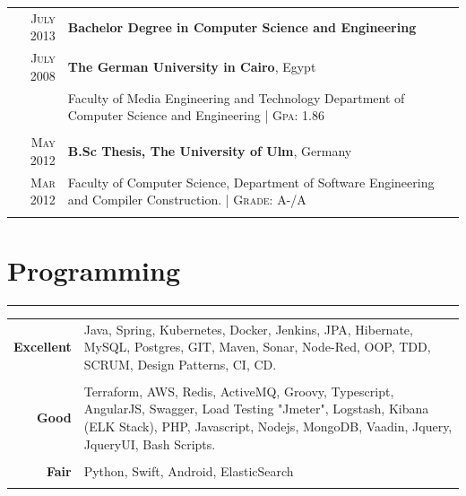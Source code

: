 \documentclass[a4paper,13pt]{article}
\begin{document}
\begin{adjustwidth}{-3cm}{}
\begin{tabular}{r|p{17.5cm}}
\textsc{July} 2013 & \textbf{Bachelor Degree in Computer Science and Engineering}\\ \textsc{July} 2008& \normalsize\textbf{The German University in Cairo}, Egypt\\
& \small{Faculty of Media Engineering and Technology} \small{Department of Computer Science and Engineering}  \footnotesize \hfill| \normalsize \textsc{Gpa}: 1.86
\\\multicolumn{2}{c}{} \\

\textsc{May} 2012 & \textbf{B.Sc Thesis, The University of Ulm}, Germany\\
\textsc{Mar} 2012 & \small{Faculty of Computer Science, Department of Software Engineering and} \small{Compiler Construction.} 
 \hfill| \footnotesize \normalsize \textsc{Grade}: A-/A 
\\\multicolumn{2}{c}{}
\end{tabular}


\section{Programming}
\rule[0pt]{20cm}{0.5pt}

\begin{tabular}{r|p{17.5cm}}
\textbf{Excellent}  &Java, Spring, Kubernetes, Docker, Jenkins, JPA, Hibernate, MySQL, Postgres, GIT, Maven, Sonar, Node-Red, OOP, TDD, SCRUM, Design Patterns,  CI, CD.
\\\multicolumn{2}{c}{} \\
\textbf{Good}  &  Terraform, AWS, Redis, ActiveMQ,  Groovy, Typescript, AngularJS, Swagger, Load Testing "Jmeter",  Logstash, Kibana (ELK Stack), PHP, Javascript, Nodejs, MongoDB, Vaadin, Jquery, JqueryUI, Bash Scripts.
\\\multicolumn{2}{c}{} \\
\textbf{Fair}  & Python, Swift, Android, ElasticSearch
\\\multicolumn{2}{c}{} 
\end{tabular}





\end{adjustwidth}
\end{document}
